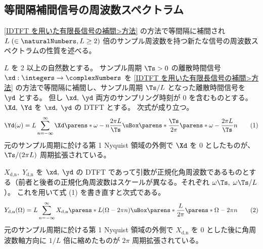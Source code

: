        \subsection{等間隔補間信号の周波数スペクトラム}
            \newcommand{\Xdn}{X_\text{d,n}}
            \newcommand{\Ydn}{Y_\text{d,n}}
            \ref{IDTFT を用いた有限長信号の補間>方法} の方法で等間隔に補間され $L\;(\in\naturalNumbers,L\geq 2)$ 倍のサンプル周波数を持つ新たな信号の周波数スペクトラムの性質を述べる。
            \begin{shadebox}
                $L$ を 2 以上の自然数とする。
                サンプル周期 $\Ts>0$ の離散時間信号 $\xd:\integers\to\complexNumbers$ を \ref{IDTFT を用いた有限長信号の補間>方法} の方法で等間隔に補間し、サンプル周期 $\Ts/L$ となった離散時間信号を $\yd$ とする。
                但し $\xd,\;\yd$ 両方のサンプリング時刻が 0 を含むものとする。
                $\Xd,\;\Yd$ を $\xd,\;\yd$ の DTFT とする。
                次式が成り立つ。
                \[ \Yd(\omega) = L\sum_{n=-\infty}^\infty \Xd\parens*{\omega-n\frac{2\pi L}{\Ts}}\uBox\parens*{\frac{\Ts}{2\pi}\parens*{\omega-\frac{2\pi L}{\Ts}n}} \tag{1} \]
                元のサンプル周期に於ける第 1 Nyquist 領域の外側で $\Xd$ を 0 としたものが、 $\Ts/(2\pi L)$ 周期拡張されている。
                \par
                $\Xdn,\;\Ydn$ を $\xd,\;\yd$ の DTFT であって引数が正規化角周波数であるものとする（前者と後者の正規化角周波数はスケールが異なる。それぞれ $\omega\Ts,\;\omega\Ts/L$）。
                これを用いて式 (1) を書き直すと次式である。
                \[ \Ydn(\Omega) = L\sum_{n=-\infty}^\infty \Xdn\parens*{L(\Omega-2\pi n)}\uBox\parens*{\frac{L}{2\pi}\parens*{\Omega-2\pi n}} \tag{2} \]
                元のサンプル周期に於ける第 1 Nyquist 領域の外側で $\Xdn$ を 0 とした後に角周波数軸方向に $1/L$ 倍に縮めたものが $2\pi$ 周期拡張されている。
            \end{shadebox}
